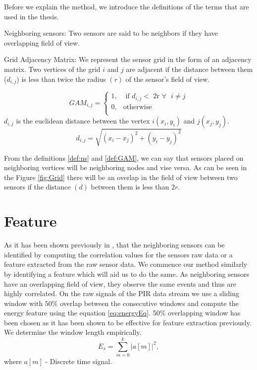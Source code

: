 Before we explain the method, we introduce the definitions of the terms that are used in the thesis.
\begin{definition}{Neighboring sensors:}
 Two sensors are said to be neighbors if they have overlapping field of view.
\label{def:ns}
\end{definition}
\begin{definition}{Grid Adjacency Matrix:}
 We represent the sensor grid in the form of an adjacency matrix. Two vertices of the grid $i$ and $j$ are adjacent if the distance between them ($d_{i,j}$) is less than twice the radius $(r)$ of the sensor's field of view.

\[
GAM_{i,j} = 
\begin{cases}
1, &\text{ if } d_{i,j} < \text{  2r } \forall \text{ } i \ne j\\
0, & \text{otherwise}\\
\end{cases}
    \]
$d_{i,j}$  is the euclidean distance between the vertex $ i(x_i,y_i)$ and $j(x_j,y_j)$.
\begin{equation*}
d_{i,j}=\sqrt{(x_i-x_j)^2 + (y_i-y_j)^2}
\end{equation*}
\label{def:GAM}
\end{definition}
From the definitions \ref{def:ns} and \ref{def:GAM}, we can say that sensors placed on neighboring vertices will be neighboring nodes and vise versa. As can be seen in the Figure \ref{fig:Grid} there will be an overlap in the field of view between two sensors if the distance $(d)$ between them is less than $2r$.

\section{Feature}
\label{sec:energy}
As it has been shown previously in \cite{Hong:2013:TAS:2528282.2528302,doi:10.1061/9780784413616.226,Koc:2014:CLC:2674061.2674075}, that the neighboring sensors can be identified by computing the correlation values for the sensors raw data or a feature extracted from the raw sensor data. We commence our method similarly by identifying a feature which will aid us to do the same. As neighboring sensors have an overlapping field of view, they observe the same events and thus are highly correlated. On the raw signals of the PIR data stream we use a sliding window with $50\%$ overlap between the consecutive windows and compute the energy feature using the equation \ref{eq:energyEq}. 50\% overlapping window has been chosen as it has been shown to be effective for feature extraction previously\cite{bao2004activity}. We determine the window length empirically.
\begin{equation}
\label{eq:energyEq}
E_s = {\sum_{m=0}^{k}{|a[m]|}^2},
\end{equation}
where $a[m]$ - Discrete time signal.


